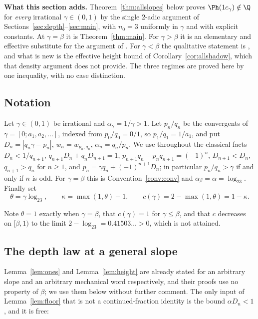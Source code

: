 \medskip
\noindent\textbf{What this section adds.} Theorem~\ref{thm:allslopes} below
proves $\Ph(1c_\gamma)\notin\Q$ for \emph{every} irrational $\gamma\in(0,1)$ by
the single $2$-adic argument of Sections~\ref{sec:depth}--\ref{sec:main}, with
$n_0=3$ uniformly in $\gamma$ and with explicit constants. At $\gamma=\beta$ it
is Theorem~\ref{thm:main}. For $\gamma>\beta$ it is an elementary and effective
substitute for the argument of \cite{LopezStoll2021}. For $\gamma<\beta$ the
qualitative statement is \cite{MonksYazinski2004}, and what is new is the
effective height bound of Corollary~\ref{cor:allshadow}, which that density
argument does not provide. The three regimes are proved here by one
inequality, with no case distinction.

\subsection*{Notation}

\begin{convention}\label{conv:gamma}
Let $\gamma\in(0,1)$ be irrational and $\alpha_\gamma=1/\gamma>1$. Let
$p_n/q_n$ be the convergents of $\gamma=[0;a_1,a_2,\dots]$, indexed from
$p_0/q_0=0/1$, so $p_1/q_1=1/a_1$, and put $D_n=|q_n\gamma-p_n|$,
$w_n=w_{p_n,q_n}$, $\alpha_n=q_n/p_n$. We use throughout the classical facts
$D_n<1/q_{n+1}$, $q_{n+1}D_n+q_nD_{n+1}=1$, $p_{n+1}q_n-p_nq_{n+1}=(-1)^n$,
$D_{n+1}<D_n$, $q_{n+1}>q_n$ for $n\ge1$, and
$p_n=\gamma q_n+(-1)^{n+1}D_n$; in particular $p_n/q_n>\gamma$ if and only if
$n$ is odd. For $\gamma=\beta$ this is Convention~\ref{conv:conv} and
$\alpha_\beta=\alpha=\log_23$. Finally set
\[
\theta=\gamma\log_23,\qquad \kappa=\max(1,\theta)-1,\qquad
c(\gamma)=2-\max(1,\theta)=1-\kappa .
\]
\end{convention}

\noindent Note $\theta=1$ exactly when $\gamma=\beta$, that $c(\gamma)=1$ for
$\gamma\le\beta$, and that $c$ decreases on $[\beta,1)$ to the limit
$2-\log_23=0.41503\ldots>0$, which is not attained.

\subsection*{The depth law at a general slope}

Lemma~\ref{lem:ones} and Lemma~\ref{lem:height} are already stated for an
arbitrary slope and an arbitrary mechanical word respectively, and their proofs
use no property of $\beta$; we use them below without further comment. The only
input of Lemma~\ref{lem:floor} that is not a continued-fraction identity is the
bound $\alpha D_n<1$, and it is free:

